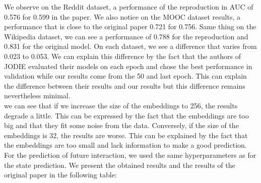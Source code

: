 We observe on the Reddit dataset, a performance of the reproduction in AUC of 0.576 for 0.599 in the paper. We also notice on the MOOC dataset results, a performance that is close to the original paper 0.721 for 0.756. Same thing on the Wikipedia dataset, we can see a performance of 0.788 for the reproduction and 0.831 for the original model. On each dataset, we see a difference that varies from 0.023 to 0.053. We can explain this difference by the fact that the authors of JODIE evaluated their models on each epoch and chose the best performance in validation while our results come from the 50 and last epoch. This can explain the difference between their results and our results but this difference remains nevertheless minimal.\\
we can see that if we increase the size of the embeddings to 256, the results degrade a little. This can be expressed by the fact that the embeddings are too big and that they fit some noise from the data. Conversely, if the size of the embeddings is 32, the results are worse. This can be explained by the fact that the embeddings are too small and lack information to make a good prediction.\\

For the prediction of future interaction, we used the same hyperparameters as for the state prediction. We present the obtained results and the results of the original paper in the following table:


